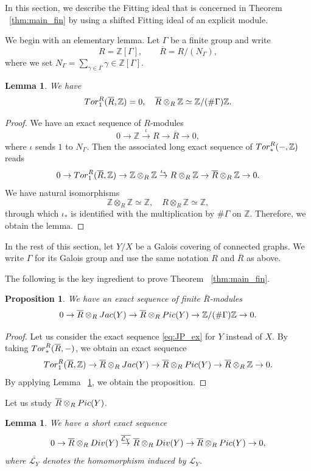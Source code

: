 \documentclass[11pt]{article}
\newtheorem{lemm}[theo]{Lemma}
\newtheorem{prop}[theo]{Proposition}
\theoremstyle{definition}
\numberwithin{equation}{section}
\newcommand{\Z}{\mathbb{Z}}
\newcommand{\cL}{\mathcal{L}}
\newcommand{\ol}[1]{\overline{#1}}
\newcommand{\Div}{{\rm Div}}
\newcommand{\Pic}{{\rm Pic}}
\newcommand{\Jac}{{\rm Jac}}
\newcommand{\Tor}{{\rm Tor}}
\begin{document}
In this section, we describe the Fitting ideal that is concerned in Theorem ~\ref{thm:main_fin} by using a shifted Fitting ideal of an explicit module.

We begin with an elementary lemma.
Let $\Gamma$ be a finite group and write
\[
R = \Z[\Gamma],
\qquad
\ol{R} = R/(N_{\Gamma}),
\]
where we set $N_{\Gamma} = \sum_{\gamma \in \Gamma} \gamma \in \Z[\Gamma]$.

\begin{lemm}\label{lem:Tor1}
We have
\[
\Tor_1^R(\ol{R}, \Z) = 0,
\quad
\ol{R} \otimes_R \Z \simeq \Z/(\# \Gamma)\Z.
\]
\end{lemm}

\begin{proof}
We have an exact sequence of $R$-modules
\[
0 \to \Z \overset{\iota}{\to} R \to \ol{R} \to 0,
\]
where $\iota$ sends $1$ to $N_{\Gamma}$.
Then the associated long exact sequence of $\Tor_{*}^R(-, \Z)$ reads
\[
0 \to \Tor_1^R(\ol{R}, \Z) \to \Z \otimes_R \Z \overset{\iota_*}{\to} R \otimes_R \Z \to \ol{R} \otimes_R \Z \to 0.
\]
We have natural isomorphisms
\[
\Z \otimes_R \Z \simeq \Z,
\quad
R \otimes_R \Z \simeq \Z,
\]
through which $\iota_*$ is identified with the multiplication by $\# \Gamma$ on $\Z$.
Therefore, we obtain the lemma.
\end{proof}

In the rest of this section, let $Y/X$ be a Galois covering of connected graphs.
We write $\Gamma$ for its Galois group and use the same notation $R$ and $\ol{R}$ as above.

The following is the key ingredient to prove Theorem ~\ref{thm:main_fin}.

\begin{prop}\label{prop:Jac_ex1}
We have an exact sequence of finite $\ol{R}$-modules
\[
0 \to \ol{R} \otimes_R \Jac(Y) \to \ol{R} \otimes_R \Pic(Y) \to \Z/(\# \Gamma)\Z \to 0.
\]
\end{prop}

\begin{proof}
Let us consider the exact sequence \eqref{eq:JP_ex} for $Y$ instead of $X$.
By taking $\Tor_*^R(\ol{R}, -)$, we obtain an exact sequence
\[
\Tor_1^R(\ol{R}, \Z) \to \ol{R} \otimes_R \Jac(Y) \to \ol{R} \otimes_R \Pic(Y) \to \ol{R} \otimes_R \Z \to 0.
\]
By applying Lemma ~\ref{lem:Tor1}, we obtain the proposition.
\end{proof}

Let us study $\ol{R} \otimes_R \Pic(Y)$.

\begin{lemm}\label{lem:olPic}
We have a short exact sequence
\[
0 \to\ol{R} \otimes_R \Div(Y) \overset{\ol{\cL_{Y}}}{\to} \ol{R} \otimes_R \Div(Y) \to \ol{R} \otimes_R \Pic(Y) \to 0,
\]
where $\ol{\cL_Y}$ denotes the homomorphism induced by $\cL_Y$.
\end{lemm}
\end{document}
